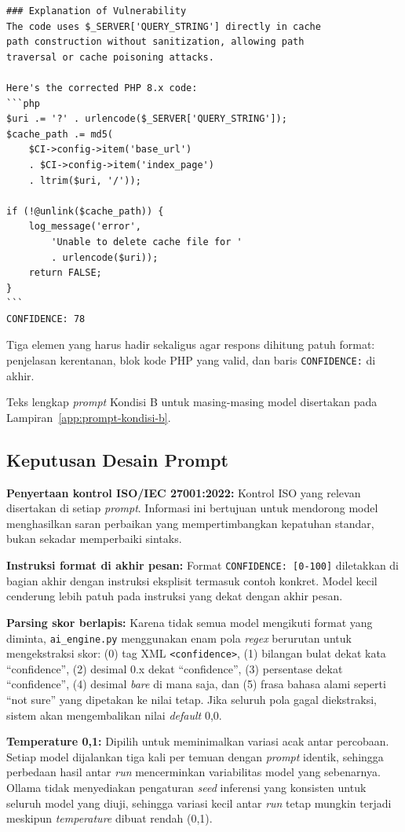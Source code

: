 \begin{lstlisting}[style=promptstyle]
### Explanation of Vulnerability
The code uses $_SERVER['QUERY_STRING'] directly in cache
path construction without sanitization, allowing path
traversal or cache poisoning attacks.

Here's the corrected PHP 8.x code:
```php
$uri .= '?' . urlencode($_SERVER['QUERY_STRING']);
$cache_path .= md5(
    $CI->config->item('base_url')
    . $CI->config->item('index_page')
    . ltrim($uri, '/'));

if (!@unlink($cache_path)) {
    log_message('error',
        'Unable to delete cache file for '
        . urlencode($uri));
    return FALSE;
}
```
CONFIDENCE: 78
\end{lstlisting}
Tiga elemen yang harus hadir sekaligus agar respons dihitung
patuh format: penjelasan kerentanan, blok kode PHP yang valid,
dan baris \texttt{CONFIDENCE:} di akhir.

Teks lengkap \textit{prompt} Kondisi B untuk masing-masing model
disertakan pada Lampiran~\ref{app:prompt-kondisi-b}.

\subsection{Keputusan Desain Prompt}

\textbf{Penyertaan kontrol ISO/IEC 27001:2022:} Kontrol ISO yang relevan disertakan di setiap \textit{prompt}. Informasi ini bertujuan untuk mendorong model menghasilkan saran perbaikan yang mempertimbangkan kepatuhan standar, bukan sekadar memperbaiki sintaks.

\textbf{Instruksi format di akhir pesan:} Format \texttt{CONFIDENCE: [0-100]} diletakkan di bagian akhir dengan instruksi eksplisit termasuk contoh konkret. Model kecil cenderung lebih patuh pada instruksi yang dekat dengan akhir pesan.

\textbf{Parsing skor berlapis:} Karena tidak semua model mengikuti format yang diminta, \texttt{ai\_engine.py} menggunakan enam pola \textit{regex} berurutan untuk mengekstraksi skor: (0) tag XML \texttt{<confidence>}, (1) bilangan bulat dekat kata ``confidence'', (2) desimal 0.x dekat ``confidence'', (3) persentase dekat ``confidence'', (4) desimal \textit{bare} di mana saja, dan (5) frasa bahasa alami seperti ``not sure'' yang dipetakan ke nilai tetap. Jika seluruh pola gagal diekstraksi, sistem akan mengembalikan nilai \textit{default} 0,0.

\textbf{Temperature 0,1:} Dipilih untuk meminimalkan variasi acak antar percobaan. Setiap model dijalankan tiga kali per temuan dengan \textit{prompt} identik, 
sehingga perbedaan hasil antar \textit{run} mencerminkan variabilitas 
model yang sebenarnya. Ollama tidak menyediakan pengaturan \textit{seed} inferensi yang 
konsisten untuk seluruh model yang diuji, sehingga variasi kecil 
antar \textit{run} tetap mungkin terjadi meskipun \textit{temperature} 
dibuat rendah (0,1).

